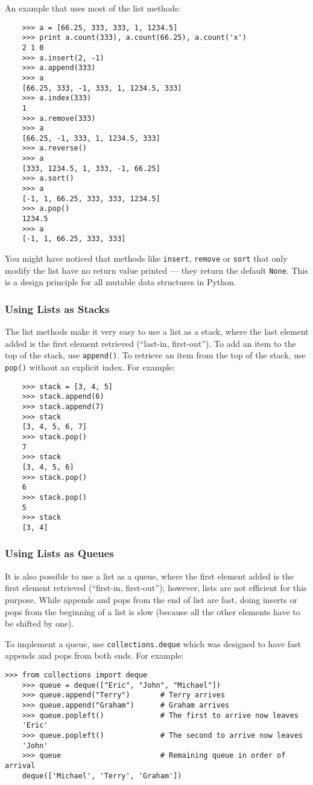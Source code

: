 \documentclass[UTF8]{article}
\begin{document}
An example that uses most of the list methods:
\begin{verbatim}
    >>> a = [66.25, 333, 333, 1, 1234.5]
    >>> print a.count(333), a.count(66.25), a.count('x')
    2 1 0
    >>> a.insert(2, -1)
    >>> a.append(333)
    >>> a
    [66.25, 333, -1, 333, 1, 1234.5, 333]
    >>> a.index(333)
    1
    >>> a.remove(333)
    >>> a
    [66.25, -1, 333, 1, 1234.5, 333]
    >>> a.reverse()
    >>> a
    [333, 1234.5, 1, 333, -1, 66.25]
    >>> a.sort()
    >>> a
    [-1, 1, 66.25, 333, 333, 1234.5]
    >>> a.pop()
    1234.5
    >>> a
    [-1, 1, 66.25, 333, 333]
\end{verbatim}

You might have noticed that methods like \texttt{insert}, \texttt{remove} or \texttt{sort} that
only modify the list have no return value printed --- they return the default \texttt{None}. This
is a design principle for all mutable data structures in Python.

\subsubsection{Using Lists as Stacks}
The list methods make it very easy to use a list as a stack, where the last element added is the
first element retrieved (``last-in, first-out''). To add an item to the top of the stack, use
\texttt{append()}. To retrieve an item from the top of the stack, use \texttt{pop()} without an
explicit index. For example:
\begin{verbatim}
    >>> stack = [3, 4, 5]
    >>> stack.append(6)
    >>> stack.append(7)
    >>> stack
    [3, 4, 5, 6, 7]
    >>> stack.pop()
    7
    >>> stack
    [3, 4, 5, 6]
    >>> stack.pop()
    6
    >>> stack.pop()
    5
    >>> stack
    [3, 4]
\end{verbatim}

\subsubsection{Using Lists as Queues}
It is also possible to use a list as a queue, where the first element added is the first element
retrieved (``first-in, first-out''); however, lists are not efficient for this purpose. While
appends and pops from the end of list are fast, doing inserts or pops from the beginning of a list
is slow (because all the other elements have to be shifted by one).

To implement a queue, use \texttt{collections.deque} which was designed to have fast appends and
pops from both ends. For example:
\begin{verbatim}
>>> from collections import deque
    >>> queue = deque(["Eric", "John", "Michael"])
    >>> queue.append("Terry")       # Terry arrives
    >>> queue.append("Graham")      # Graham arrives
    >>> queue.popleft()             # The first to arrive now leaves
    'Eric'
    >>> queue.popleft()             # The second to arrive now leaves
    'John'
    >>> queue                       # Remaining queue in order of arrival
    deque(['Michael', 'Terry', 'Graham'])
\end{verbatim}
\end{document}
